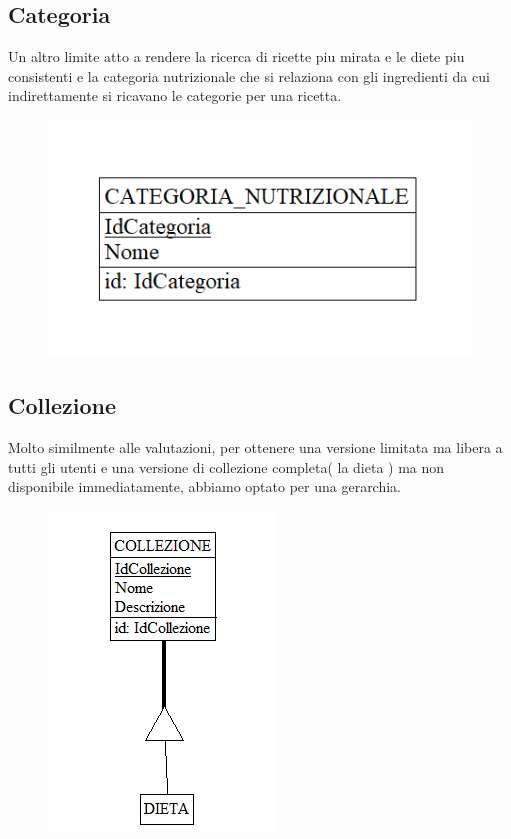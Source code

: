 ﻿\documentclass[a4paper,12pt]{report}
\begin{document}
\subsection{Categoria}
Un altro limite atto a rendere la ricerca di ricette
piu mirata e le diete piu consistenti e la categoria nutrizionale
che si relaziona con gli ingredienti da cui indirettamente si ricavano le categorie
per una ricetta.
\begin{figure}[H]
    \centering
    \includegraphics[width=0.8\linewidth]{app_images/categoria-nutrizionale.png}
\end{figure}
\subsection{Collezione}
Molto similmente alle valutazioni, per ottenere una versione limitata
ma libera a tutti gli utenti e una versione di collezione completa( la dieta )
ma non disponibile immediatamente, abbiamo optato per una gerarchia.
\begin{figure}[H]
    \centering
    \includegraphics[width=0.5\linewidth]{app_images/collezione-concettuale.png}
\end{figure}
\end{document}
